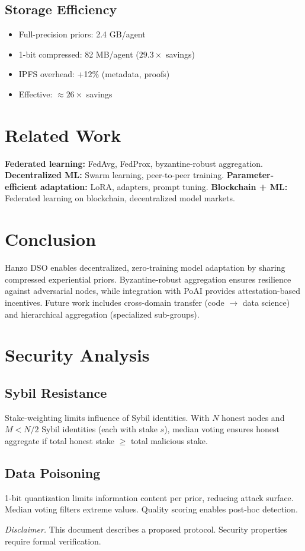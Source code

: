 \documentclass[11pt]{article}
\begin{document}
\subsection{Storage Efficiency}
\begin{itemize}[leftmargin=1.1em]
  \item Full-precision priors: 2.4 GB/agent
  \item 1-bit compressed: 82 MB/agent (\(29.3\times\) savings)
  \item IPFS overhead: +12\% (metadata, proofs)
  \item Effective: \(\approx 26\times\) savings
\end{itemize}

\section{Related Work}
\textbf{Federated learning:} FedAvg, FedProx, byzantine-robust aggregation. \textbf{Decentralized ML:} Swarm learning, peer-to-peer training. \textbf{Parameter-efficient adaptation:} LoRA, adapters, prompt tuning. \textbf{Blockchain + ML:} Federated learning on blockchain, decentralized model markets.

\section{Conclusion}
Hanzo DSO enables decentralized, zero-training model adaptation by sharing compressed experiential priors. Byzantine-robust aggregation ensures resilience against adversarial nodes, while integration with PoAI provides attestation-based incentives. Future work includes cross-domain transfer (code \(\to\) data science) and hierarchical aggregation (specialized sub-groups).

\appendix
\section{Security Analysis}
\subsection{Sybil Resistance}
Stake-weighting limits influence of Sybil identities. With \(N\) honest nodes and \(M < N/2\) Sybil identities (each with stake \(s\)), median voting ensures honest aggregate if total honest stake \(\ge\) total malicious stake.

\subsection{Data Poisoning}
1-bit quantization limits information content per prior, reducing attack surface. Median voting filters extreme values. Quality scoring enables post-hoc detection.

\vspace{1em}
\noindent\textit{Disclaimer.} This document describes a proposed protocol. Security properties require formal verification.
\end{document}
